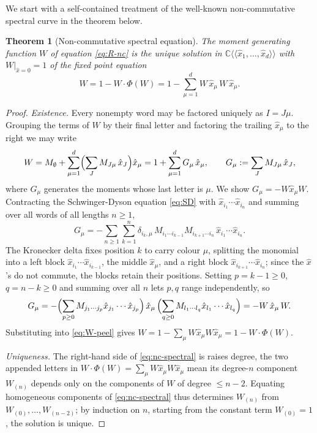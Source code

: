 \documentclass[11pt,a4paper]{article}
\newtheorem{theorem}{Theorem}[section]
\newcommand{\xh}{\hat{x}}
\begin{document}
We start with a self-contained treatment of the well-known non-commutative spectral curve \cite{anderson2010introduction} in the theorem below.

\begin{theorem}[Non-commutative spectral equation]\label{thm:nc-spectral}
The moment generating function $W$ of equation \eqref{eq:R-nc} is the unique solution in $\mathbb{C}\langle\langle\xh_1,\ldots,\xh_d\rangle\rangle$ with $W|_{\xh=0}=1$ of the fixed point equation
\begin{equation}\label{eq:nc-spectral}
  W = 1 - W\cdot\Phi(W) = 1 - \sum_{\mu=1}^d W\,\xh_\mu\,W\,\xh_\mu.
\end{equation}
\end{theorem}

\begin{proof}
\emph{Existence.}
Every nonempty word may be factored uniquely as $I=J\mu$. Grouping the terms of $W$ by their
final letter and factoring the trailing $\xh_\mu$ to the right we may write
\begin{equation}\label{eq:W-peel}
  W = M_{\emptyset} + \sum_{\mu=1}^d\Bigl(\sum_J M_{J\mu}\,\xh_J\Bigr)\xh_\mu
    = 1 + \sum_{\mu=1}^d G_\mu\,\xh_\mu,
  \qquad
  G_\mu := \sum_J M_{J\mu}\,\xh_J,
\end{equation}
where $G_\mu$ generates the moments whose last letter is $\mu$. We show $G_\mu = -W\xh_\mu W$. Contracting the Schwinger-Dyson equation \eqref{eq:SD} with $\xh_{i_1}\cdots\xh_{i_n}$ and summing over all words of all lengths $n\geq1$,
\begin{equation}\label{eq:Gmu-step1}
  G_\mu = -\sum_{n\geq 1}\sum_{k=1}^n\delta_{i_k,\mu}\,M_{i_1\cdots i_{k-1}}M_{i_{k+1}\cdots i_n}\,\xh_{i_1}\cdots\xh_{i_n}.
\end{equation}
The Kronecker delta fixes position $k$ to carry colour $\mu$, splitting the monomial into a left block $\xh_{i_1}\cdots\xh_{i_{k-1}}$, the middle $\xh_\mu$, and a right block $\xh_{i_{k+1}}\cdots\xh_{i_n}$; since the $\xh$'s do not commute, the blocks retain their positions. Setting $p=k-1\geq0$, $q=n-k\geq0$ and summing over all $n$ lets $p,q$ range independently, so
\begin{equation}\label{eq:Gmu-nc}
  G_\mu = -\Bigl(\sum_{p\geq0}M_{j_1\cdots j_p}\xh_{j_1}\cdots\xh_{j_p}\Bigr) \,\xh_\mu\,\Bigl(\sum_{q\geq0}M_{l_1\cdots l_q}\xh_{l_1}\cdots\xh_{l_q}\Bigr) = -W\,\xh_\mu\,W.
\end{equation}
Substituting into \eqref{eq:W-peel} gives $W = 1 - \sum_\mu W\xh_\mu W\xh_\mu = 1-W\cdot\Phi(W)$.

\emph{Uniqueness.} The right-hand side of \eqref{eq:nc-spectral} is raises degree, the two appended letters in $W\cdot\Phi(W)=\sum_\mu W\xh_\mu W\xh_\mu$ mean its degree-$n$ component $W_{(n)}$ depends only on the components of $W$ of degree $\leq n-2$. Equating homogeneous components of \eqref{eq:nc-spectral} thus determines $W_{(n)}$ from $W_{(0)},\dots,W_{(n-2)}$; by induction on $n$, starting from the constant term $W_{(0)}=1$, the solution is unique.
\end{proof}
\end{document}
